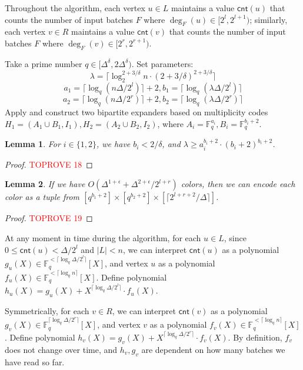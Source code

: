 \documentclass[11pt,a4paper]{article}
\newtheorem{lemma}{Lemma}[section]
\newcommand{\ceil}[1]{\lceil #1 \rceil}
\newcommand{\cnt}{\mathsf{cnt}}
\newcommand{\brac}[1]{\left(#1\right)}
\newcommand{\field}{\mathbb{F}}
\begin{document}
Throughout the algorithm, each vertex $u\in L$ maintains a value $\cnt(u)$ that counts the number of input batches $F$ where $\deg_F(u)\in [2^l, 2^{l+1})$; similarly, each vertex $v\in R$ maintains a value $\cnt(v)$ that counts the number of input batches $F$ where $\deg_F(v)\in [2^r, 2^{r+1})$. 

Take a prime number $q\in [\Delta^\delta, 2\Delta^\delta)$. Set parameters:
$$\lambda = \ceil{\log^{2+3/\delta}_2 n\cdot (2 + 3/\delta)^{2+3/\delta}}$$
$$a_1 = \ceil{\log_q (n\Delta / 2^l)}+2, b_1 = \ceil{\log_q (\lambda\Delta / 2^l)}$$
$$a_2 = \ceil{\log_q (n\Delta / 2^r)}+2, b_2 = \ceil{\log_q (\lambda\Delta / 2^r)}$$
Apply  and construct two bipartite expanders based on multiplicity codes $H_1 = (A_1\cup B_1, I_1), H_2 = (A_2\cup B_2, I_2)$, where $A_i = \field_q^{a_i}, B_i = \field_q^{b_i+2}$. 

\begin{lemma}
    For $i\in \{1,2\}$, we have $b_i< 2/\delta$, and $\lambda \geq a_i^{b_i+2}\cdot (b_i+2)^{b_i+2}$.
\end{lemma}
\begin{proof}\textcolor{red}{TOPROVE 18}\end{proof}

\begin{lemma}
If we have $O\brac{\Delta^{1+\epsilon} + \Delta^{2+\epsilon} / 2^{l+r}}$ colors, then we can encode each color as a tuple from $[q^{b_1+2}]\times [q^{b_2+2}]\times [\ceil{2^{l+r+2} / \Delta}]$.
\end{lemma}
\begin{proof}\textcolor{red}{TOPROVE 19}\end{proof}

At any moment in time during the algorithm, for each $u\in L$, since $0\leq \cnt(u) < \Delta / 2^l$ and $|L| < n$, we can interpret $\cnt(u)$ as a polynomial $g_u(X)\in \field_q^{<\ceil{\log_q \Delta / 2^l}}[X]$, and vertex $u$ as a polynomial $f_u(X)\in \field_q^{<\ceil{\log_q n}}[X]$. Define polynomial $h_u(X) = g_u(X) + X^{\ceil{\log_q \Delta / 2^l}}\cdot f_u(X)$.

Symmetrically, for each $v\in R$, we can interpret $\cnt(v)$ as a polynomial $g_v(X)\in \field_q^{\ceil{\log_q \Delta / 2^r}}[X]$, and vertex $v$ as a polynomial $f_v(X)\in \field_q^{<\ceil{\log_q n}}[X]$. Define polynomial $h_v(X) = g_v(X) + X^{\ceil{\log_q \Delta / 2^r}}\cdot f_v(X)$. By definition, $f_v$ does not change over time, and $h_v, g_v$ are dependent on how many batches we have read so far.
\end{document}
